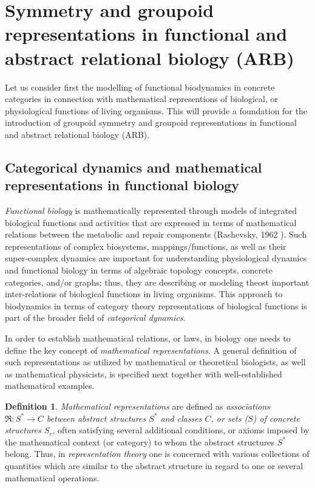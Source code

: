 \documentclass[12pt]{article}
\theoremstyle{plain}
\theoremstyle{definition}
\newtheorem{definition}{Definition}[section]
\numberwithin{equation}{section}
\newcommand{\<}{{\langle}}
\begin{document}
\section{Symmetry and groupoid representations in functional and abstract relational biology (ARB)}

 Let us consider first the modelling of functional biodynamics in concrete categories in connection with
mathematical representions of biological, or physiological functions of living organisms.
This will provide a foundation for the introduction of groupoid symmetry and groupoid
representations in functional and abstract relational biology (ARB).

\subsection{Categorical dynamics and mathematical representations in functional biology}
\emph{Functional biology} is mathematically represented through models of integrated biological functions and activities that are expressed in terms of mathematical relations between the metabolic and repair components (Rashevsky, 1962 \cite{NR62}). Such representations of complex biosystems, mappings/functions, as well as their super-complex dynamics are important for understanding physiological dynamics and functional biology in terms of algebraic topology concepts, concrete categories, and/or graphs; thus, they are describing or modeling theost important
inter-relations of biological functions in living organisms. This approach to biodynamics in terms of
category theory representations of biological functions is part of the broader field of \emph{categorical dynamics}.

In order to establish mathematical relations, or laws, in biology one needs to define the key concept of 
\emph{mathematical representations}. A general definition of such representations as utilized by mathematical or theoretical biologists, as well as mathematical physicists, is specified next together with well-established mathematical examples.

\begin{definition}
\emph{Mathematical representations} are defined as \emph{associations $\Re : S^* \to C $
between abstract structures $S^*$ and classes $C$, or sets ($S$) of concrete structures $S_c$}, often satisfying
several additional conditions, or axioms imposed by the mathematical context (or category) to whom 
the abstract structures $S^*$ belong. Thus, in \emph{representation theory} one is concerned with various collections
of quantities which are similar to the abstract structure in regard to one or several mathematical operations.   
\end{definition}
\end{document}
